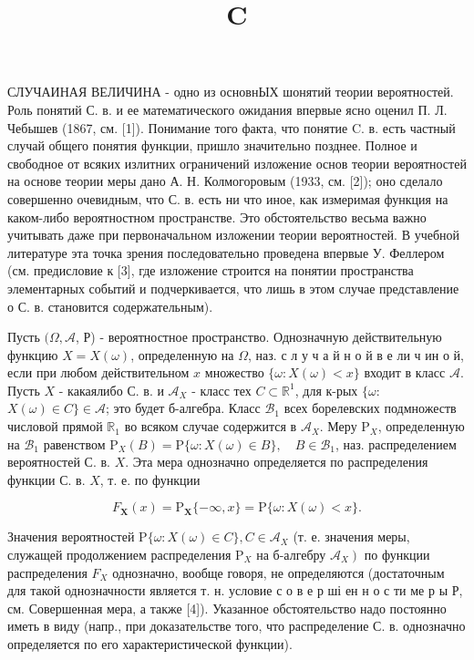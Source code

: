 \documentclass[10pt]{article}
\title{$\mathbf{C}$ }
\author{}
\date{}
\begin{document}
\maketitle

СЛУЧАИНАЯ ВЕЛИЧИНА - одно из основнЫХ шонятий теории вероятностей. Роль понятий С. в. и ее математического ожидания впервые ясно оценил П. Л. Чебышев (1867, см. [1]). Понимание того факта, что понятие C. в. есть частный случай общего понятия функции, пришло значительно позднее. Полное и свободное от всяких излитних ограничений изложение основ теории вероятностей на основе теории меры дано А. Н. Колмогоровым (1933, см. [2]); оно сделало совершенно очевидным, что С. в. есть ни что иное, как измеримая функция на каком-либо вероятностном пространстве. Это обстоятельство весьма важно учитывать даже при первоначальном изложении теории вероятностей. В учебной литературе эта точка зрения последовательно проведена впервые У. Феллером (см. предисловие к [3], где изложение строится на понятии пространства элементарных событий и подчеркивается, что лишь в этом случае представление о С. в. становится содержательным).



Пусть $(\Omega, \mathcal{A}$, Р) - вероятностное пространство. Однозначную действительную функцию $X=X(\omega)$, определенную на $\Omega$, наз. с л у ч а й н о й в е ли ч ин о й, если при любом действительном $x$ множество $\{\omega: X(\omega)<x\}$ входит в класс $\mathcal{A}$. Пусть $X$ - какаялибо С. в. и $\mathcal{A}_{X}$ - класс тех $C \subset \mathbb{R}^{1}$, для к-рых $\{\omega:$ $X(\omega) \in C\} \in \mathcal{A}$; это будет б-алгебра. Класс $\mathscr{B}_{1}$ всех борелевских подмножеств числовой прямой $\mathbb{R}_{1}$ во всяком случае содержится в $\mathcal{A}_{X}$. Меру $\mathrm{P}_{X}$, определенную на $\mathscr{B}_{1}$ равенством $\mathrm{P}_{X}(B)=\mathrm{P}\{\omega: X(\omega) \in B\}, \quad B \in \mathscr{B}_{1}$, наз. распределением вероятностей С. в. $X$. Эта мера однозначно определяется по распределения функции С. в. $X$, т. е. по функции



\[

F_{\boldsymbol{X}}(x)=\mathrm{P}_{\boldsymbol{X}}\{-\infty, x\}=\mathrm{P}\{\omega: X(\omega)<x\} .

\]



Значения вероятностей $\mathrm{P}\{\omega: X(\omega) \in C\}, C \in \mathcal{A}_{X}$ (т. е. значения меры, служащей продолжением распределения $\mathrm{P}_{X}$ на б-алгебру $\left.\mathcal{A}_{X}\right)$ по функции распределения $F_{X}$ однозначно, вообще говоря, не определяются (достаточным для такой однозначности является т. н. условие с о в е р ші ен н о с ти ме р ы Р, см. Совершенная мера, а также [4]). Указанное обстоятельство надо постоянно иметь в виду (напр., при доказательстве того, что распределение С. в. однозначно определяется по его характеристической функции).
\end{document}
